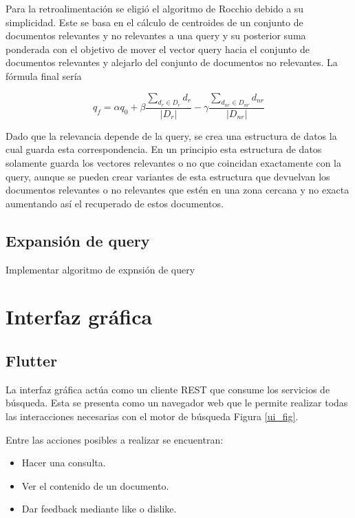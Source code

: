 \documentclass[runningheads]{llncs}
\begin{document}
Para la retroalimentación se eligió el algoritmo de Rocchio debido a su simplicidad. Este se basa 
en el cálculo de centroides de un conjunto de documentos relevantes y no relevantes a una query
y su posterior suma ponderada con el objetivo de mover el vector query hacia el conjunto de 
documentos relevantes y alejarlo del conjunto de documentos no relevantes. La fórmula final sería

\begin{equation}
    q_f = \alpha q_0 + \beta \frac{\sum_{d_r \in D_r} d_r}{|D_r|} - \gamma \frac{\sum_{d_{nr} \in D_{nr}} d_{nr}}{|D_{nr}|} 
\end{equation}

Dado que la relevancia depende de la query, se crea una estructura de datos la cual guarda esta correspondencia. 
En un principio esta estructura de datos solamente guarda los vectores relevantes o no que coincidan exactamente
con la query, aunque se pueden crear variantes de esta estructura que devuelvan los documentos relevantes o no
relevantes que estén en una zona cercana y no exacta aumentando así el recuperado de estos documentos.

\subsection{Expansión de query}

Implementar algoritmo de expnsión de query

\section{Interfaz gráfica}

\subsection{Flutter}

La interfaz gráfica actúa como un cliente REST que consume los servicios de búsqueda. Esta
se presenta como un navegador web que le permite realizar todas las interacciones necesarias
con el motor de búsqueda Figura \ref{ui_fig}.

Entre las acciones posibles a realizar se encuentran:

\begin{itemize}

\item Hacer una consulta.
\item Ver el contenido de un documento.
\item Dar feedback mediante like o dislike.

\end{itemize}
\end{document}

